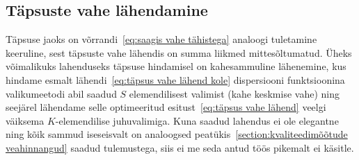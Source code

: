 \subsection{Täpsuste vahe lähendamine}
Täpsuse jaoks on võrrandi~\eqref{eq:saagis vahe tähistega} analoogi tuletamine keeruline, sest täpsuste vahe lähendis on summa liikmed mittesõltumatud. Üheks võimalikuks lahenduseks täpsuse hindamisel on kahesammuline lähenemine, kus hindame esmalt lähendi~\eqref{eq:täpsus vahe lähend kole} dispersiooni funktsioonina valikumeetodi abil saadud $S$ elemendilisest valimist (kahe keskmise vahe) ning seejärel lähendame selle optimeeritud esitust~\eqref{eq:täpsus vahe lähend} veelgi väiksema $K$-elemendilise juhuvalimiga. Kuna saadud lahendus ei ole elegantne ning kõik sammud iseseisvalt on analoogsed peatükis~\ref{section:kvaliteedimõõtude veahinnangud} saadud tulemustega, siis ei me seda antud töös pikemalt ei käsitle.